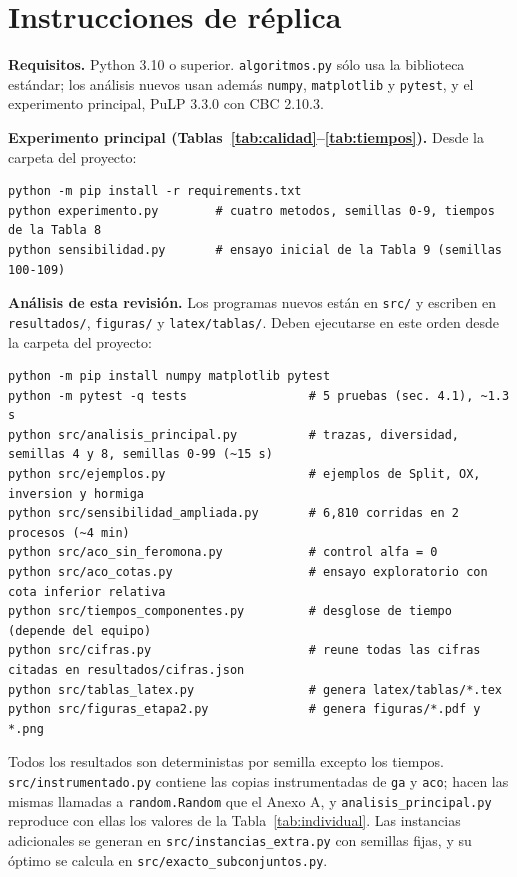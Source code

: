 \documentclass[11pt,a4paper]{article}
\numberwithin{equation}{section}
\begin{document}
\section{Instrucciones de réplica}

\textbf{Requisitos.} Python 3.10 o superior. \texttt{algoritmos.py} sólo usa la biblioteca estándar; los análisis nuevos usan además \texttt{numpy}, \texttt{matplotlib} y \texttt{pytest}, y el experimento principal, PuLP 3.3.0 con CBC 2.10.3.

\textbf{Experimento principal (Tablas~\ref{tab:calidad}--\ref{tab:tiempos}).} Desde la carpeta del proyecto:
\begin{lstlisting}
python -m pip install -r requirements.txt
python experimento.py        # cuatro metodos, semillas 0-9, tiempos de la Tabla 8
python sensibilidad.py       # ensayo inicial de la Tabla 9 (semillas 100-109)
\end{lstlisting}

\textbf{Análisis de esta revisión.} Los programas nuevos están en \texttt{src/} y escriben en \texttt{resultados/}, \texttt{figuras/} y \texttt{latex/tablas/}. Deben ejecutarse en este orden desde la carpeta del proyecto:
\begin{lstlisting}
python -m pip install numpy matplotlib pytest
python -m pytest -q tests                 # 5 pruebas (sec. 4.1), ~1.3 s
python src/analisis_principal.py          # trazas, diversidad, semillas 4 y 8, semillas 0-99 (~15 s)
python src/ejemplos.py                    # ejemplos de Split, OX, inversion y hormiga
python src/sensibilidad_ampliada.py       # 6,810 corridas en 2 procesos (~4 min)
python src/aco_sin_feromona.py            # control alfa = 0
python src/aco_cotas.py                   # ensayo exploratorio con cota inferior relativa
python src/tiempos_componentes.py         # desglose de tiempo (depende del equipo)
python src/cifras.py                      # reune todas las cifras citadas en resultados/cifras.json
python src/tablas_latex.py                # genera latex/tablas/*.tex
python src/figuras_etapa2.py              # genera figuras/*.pdf y *.png
\end{lstlisting}
Todos los resultados son deterministas por semilla excepto los tiempos. \texttt{src/instrumentado.py} contiene las copias instrumentadas de \texttt{ga} y \texttt{aco}; hacen las mismas llamadas a \texttt{random.Random} que el Anexo A, y \texttt{analisis\_principal.py} reproduce con ellas los valores de la Tabla~\ref{tab:individual}. Las instancias adicionales se generan en \texttt{src/instancias\_extra.py} con semillas fijas, y su óptimo se calcula en \texttt{src/exacto\_subconjuntos.py}.
\end{document}
